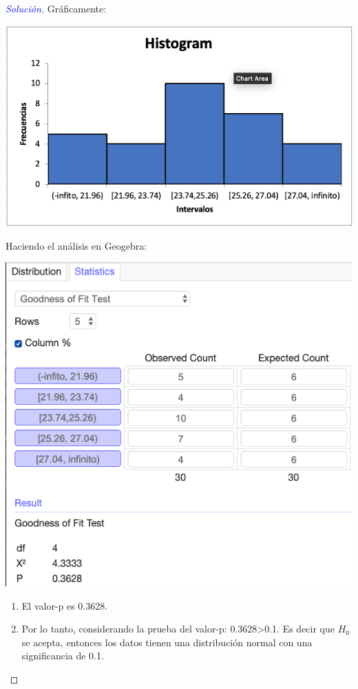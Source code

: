 \documentclass[a4paper,12pt]{article}
\newenvironment{solution}
  {\renewcommand\qedsymbol{$\square$}\begin{proof}[\textcolor{blue}{Solución}]}
  {\end{proof}}
\begin{document}
\begin{solution}
Gráficamente: 

\begin{center}
    \includegraphics[scale=0.45]{images/Screen Shot 2021-05-11 at 16.45.43.png}
\end{center}

Haciendo el análisis en Geogebra:
\begin{center}
    \includegraphics[scale=0.45]{images/Screen Shot 2021-05-11 at 16.52.55.png}
\end{center}
\begin{enumerate}
    \item El valor-p es 0.3628. 
    \item Por lo tanto, considerando la prueba del valor-p: 0.3628>0.1. Es decir que $H_0$ se acepta, entonces los datos tienen una distribución normal con una significancia de 0.1. 
\end{enumerate}
\end{solution}
\end{document}
